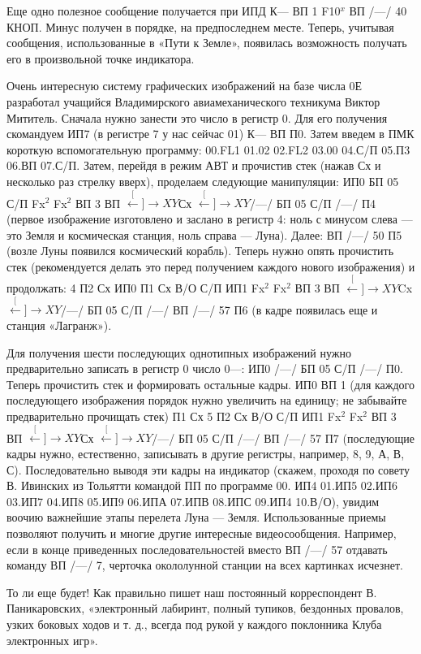 \documentclass[11pt,a4paper,oneside]{article}
\def\XY{$\stackrel[\leftarrow]{\rightarrow}{XY}$}
\begin{document}
Еще одно полезное сообщение получается при ИПД К— ВП 1 F10$^{x}$ ВП /—/ 40 КНОП. Минус получен в порядке, на предпоследнем месте. Теперь, учитывая сообщения, использованные в «Пути к Земле», появилась возможность получать его в произвольной точке индикатора.

Очень интересную систему графических изображений на базе числа 0Е разработал учащийся Владимирского авиамеханического техникума Виктор Мититель. Сначала нужно занести это число в регистр 0. Для его получения скомандуем ИП7 (в регистре 7 у нас сейчас 01) К— ВП П0. Затем введем в ПМК короткую вспомогательную программу: 00.FL1 01.02 02.FL2 03.00 04.С/П 05.П3 06.ВП 07.С/П. Затем, перейдя в режим АВТ и прочистив стек (нажав Сх и несколько раз стрелку вверх), проделаем следующие манипуляции: ИП0 БП 05 С/П Fx$^{2}$ Fx$^{2}$ ВП 3 ВП \XY Сх \XY /—/ БП 05 С/П /—/ П4 (первое изображение изготовлено и заслано в регистр 4: ноль с минусом слева — это Земля и космическая станция, ноль справа — Луна). Далее: ВП /—/ 50 П5 (возле Луны появился космический корабль). Теперь нужно опять прочистить стек (рекомендуется делать это перед получением каждого нового изображения) и продолжать: 4 П2 Сх ИП0 П1 Сх В/О С/П ИП1 Fx$^{2}$ Fx$^{2}$ ВП 3 ВП \XY Cx \XY /—/ БП 05 С/П /—/ ВП /—/ 57 П6 (в кадре появилась еще и станция «Лагранж»).

Для получения шести последующих однотипных изображений нужно предварительно записать в регистр 0 число 0—: ИП0 /—/ БП 05 С/П /—/ П0. Теперь прочистить стек и формировать остальные кадры. ИП0 ВП 1 (для каждого последующего изображения порядок нужно увеличить на единицу; не забывайте предварительно прочищать стек) П1 Сх 5 П2 Сх В/О С/П ИП1 Fx$^{2}$ Fx$^{2}$ ВП 3 ВП \XY Сх \XY /—/ БП 05 С/П /—/ ВП /—/ 57 П7 (последующие кадры нужно, естественно, записывать в другие регистры, например, 8, 9, А, В, С). Последовательно выводя эти кадры на индикатор (скажем, проходя по совету В. Ивинских из Тольятти командой ПП по программе 00. ИП4 01.ИП5 02.ИП6 03.ИП7 04.ИП8 05.ИП9 06.ИПА 07.ИПВ 08.ИПС 09.ИП4 10.В/О), увидим воочию важнейшие этапы перелета Луна — Земля. Использованные приемы позволяют получить и многие другие интересные видеосообщения. Например, если в конце приведенных последовательностей вместо ВП /—/ 57 отдавать команду ВП /—/ 7, черточка окололунной станции на всех картинках исчезнет.

То ли еще будет! Как правильно пишет наш постоянный корреспондент В. Паникаровских, «электронный лабиринт, полный тупиков, бездонных провалов, узких боковых ходов и т. д., всегда под рукой у каждого поклонника Клуба электронных игр».
\end{document}
